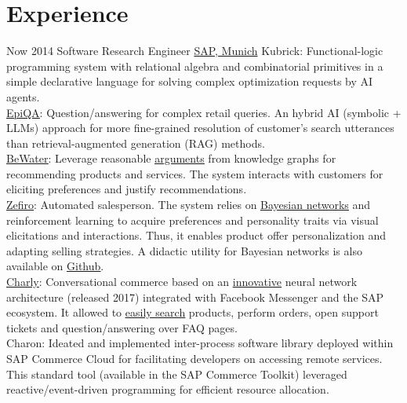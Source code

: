 \documentclass[letterpaper]{twentysecondcv} %
\begin{document}
 \makeprofile %


\section{Experience}

\begin{twenty} %
\twentyitem
    	{Now}
		{2014}
        {Software Research Engineer}
        {\href{https://www.sap.com}{SAP,  Munich}}
        {}
        {
        \textbullet Kubrick: Functional-logic programming system with relational algebra and combinatorial primitives in a simple declarative language for solving complex optimization requests by AI agents.\\
        \textbullet\href{https://epiqa.cxai.dev.sap/}{\underline{EpiQA}}: Question/answering for complex retail queries. An hybrid AI (symbolic + LLMs) approach for more fine-grained resolution of customer's search utterances than retrieval-augmented generation (RAG) methods.\\
        \textbullet\href{https://community.sap.com/t5/crm-and-cx-blogs-by-sap/argumentation-for-e-commerce-at-semantics-22/ba-p/13534345}{\underline{BeWater}}: Leverage reasonable \href{https://gfrison.com/2024/12/01/defeasible-logic-automatic-argumentation}{\underline{arguments}} from knowledge graphs for recommending products and services. The system interacts with customers for eliciting preferences and justify recommendations.\\
        \textbullet\href{https://community.sap.com/t5/tag/zefiro/tg-p/}{\underline{Zefiro}}: Automated salesperson. The system relies on \href{https://gfrison.com/tags/\#bayesian-inference}{\underline{Bayesian networks}} and reinforcement learning to acquire preferences and personality traits via visual elicitations and interactions. Thus, it enables product offer personalization and adapting selling strategies. A didactic utility for Bayesian networks is also available on \href{https://github.com/sap/bayesian-network-builder}{\underline{Github}}.\\ 
        \textbullet\href{https://gfrison.com/assets/charly.webm}{\underline{Charly}}: Conversational commerce based on an \href{https://gfrison.com/patents/smoothing-conversational-context}{\underline{innovative}} neural network architecture (released 2017) integrated with Facebook Messenger and the SAP ecosystem. It allowed to \href{https://gfrison.com/patents/concept-search-with-word-embeddings}{\underline{easily search}} products, perform orders, open support tickets and question/answering over FAQ pages.\\
        \textbullet Charon: Ideated and implemented inter-process software library deployed within SAP Commerce Cloud for facilitating developers on accessing remote services. This standard tool (available in the SAP Commerce Toolkit) leveraged reactive/event-driven programming for efficient resource allocation.\\
	    }
     

\end{twenty}
\end{document}
